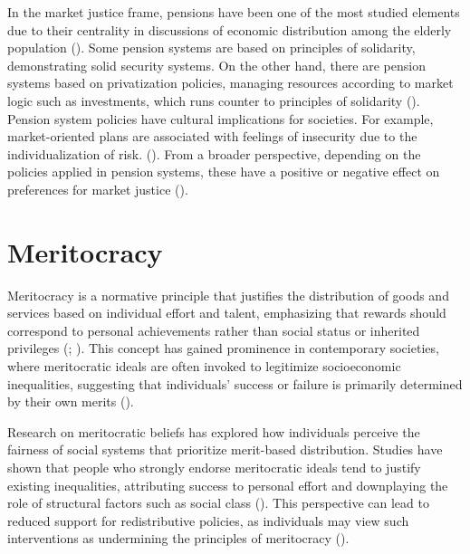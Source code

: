 \documentclass[
  12pt,
]{article}
\begin{document}
In the market justice frame, pensions have been one of the most studied
elements due to their centrality in discussions of economic distribution
among the elderly population
(). Some pension
systems are based on principles of solidarity, demonstrating solid
security systems. On the other hand, there are pension systems based on
privatization policies, managing resources according to market logic
such as investments, which runs counter to principles of solidarity
(). Pension system policies have cultural implications for
societies. For example, market-oriented plans are associated with
feelings of insecurity due to the individualization of risk.
(). From a
broader perspective, depending on the policies applied in pension
systems, these have a positive or negative effect on preferences for
market justice ().

\section{Meritocracy}\label{meritocracy}

Meritocracy is a normative principle that justifies the distribution of
goods and services based on individual effort and talent, emphasizing
that rewards should correspond to personal achievements rather than
social status or inherited privileges
(;
).
This concept has gained prominence in contemporary societies, where
meritocratic ideals are often invoked to legitimize socioeconomic
inequalities, suggesting that individuals' success or failure is
primarily determined by their own merits
().

Research on meritocratic beliefs has explored how individuals perceive
the fairness of social systems that prioritize merit-based distribution.
Studies have shown that people who strongly endorse meritocratic ideals
tend to justify existing inequalities, attributing success to personal
effort and downplaying the role of structural factors such as social
class (). This perspective can lead to reduced support for redistributive
policies, as individuals may view such interventions as undermining the
principles of meritocracy ().
\end{document}
